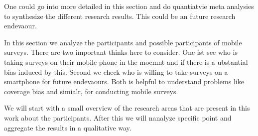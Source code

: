 One could go into more detailed in this section and do quantiatvie meta analysies to synthesize the different research results. This could be an future research endevaour. 


In this section we analyze the participants and possible participants of mobile surveys. There are two important thinks here to consider. One ist see who is taking surveys on their mobile phone in the moemnt and if there is a ubstantial bias induced by this. Second we check who is willing to take surveys on a smartphone for future endevaours. Both is helpful to understand problems like coverage bias and simialr, for conducting mobile surveys.

We will start with a small overview of the research areas that are present in this work about the participants. After this we will nanalyze specific point and aggregate the results in a qualitative way.



